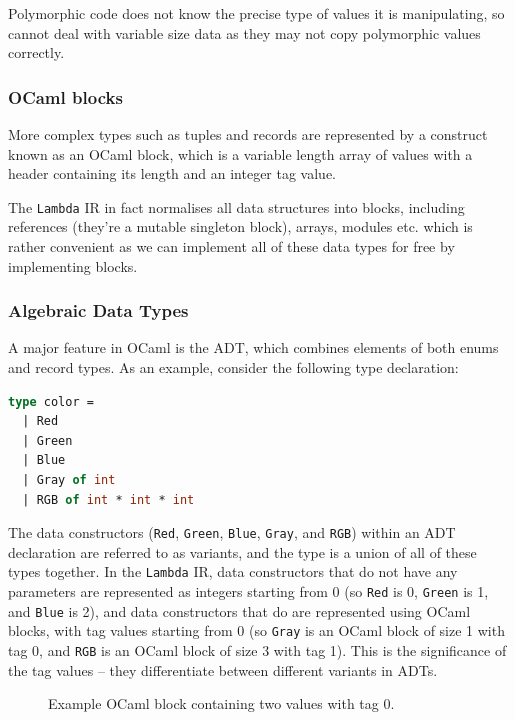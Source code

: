 Polymorphic code does not know the precise type of values it is manipulating, so
cannot deal with variable size data as they may not copy polymorphic values
correctly.

\subsubsection{OCaml blocks}

More complex types such as tuples and records are represented by a construct
known as an OCaml block, which is a variable length array of values with a
header containing its length and an integer tag value.

The \texttt{Lambda} IR in fact normalises all data structures into blocks, 
including references (they're a mutable singleton block), arrays, modules etc. 
which is rather convenient as we can implement all of these data types for free 
by implementing blocks.

\subsubsection{Algebraic Data Types}

A major feature in OCaml is the ADT, which combines elements of both enums and
record types. As an example, consider the following type declaration:

\begin{lstlisting}[language=Caml]
type color =
  | Red
  | Green
  | Blue
  | Gray of int
  | RGB of int * int * int
\end{lstlisting}

The data constructors (\texttt{Red}, \texttt{Green}, \texttt{Blue},
\texttt{Gray}, and \texttt{RGB}) within an ADT declaration are referred to as
variants, and the type is a union of all of these types together. In the
\texttt{Lambda} IR, data constructors that do not have any parameters are
represented as integers starting from 0 (so \texttt{Red} is 0, \texttt{Green} is
1, and \texttt{Blue} is 2), and data constructors that do are represented using
OCaml blocks, with tag values starting from 0 (so \texttt{Gray} is an OCaml
block of size 1 with tag 0, and \texttt{RGB} is an OCaml block of size 3 with
tag 1). This is the significance of the tag values -- they differentiate
between different variants in ADTs.

\begin{figure}
    \centering
    
    \caption{Example OCaml block containing two values with tag 0.}
    \label{fig:block-header}
\end{figure}

